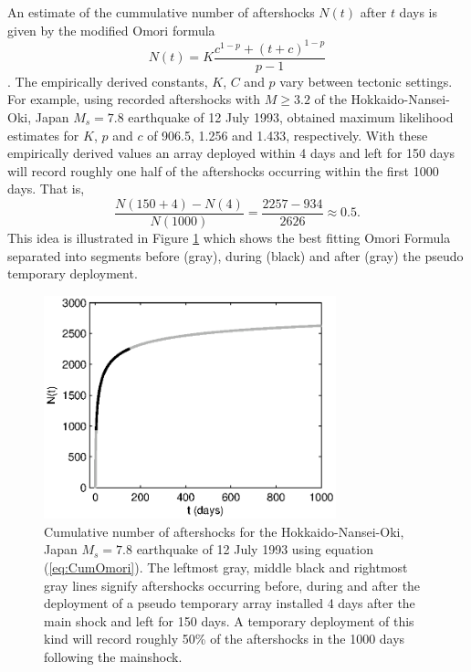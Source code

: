 \documentclass[extra, onecolumn, doublespacing]{gji}
\begin{document}
An estimate of the cummulative number of aftershocks $N(t)$ after
$t$ days is given by the modified Omori formula
\begin{equation}
\label{eq:CumOmori}
 N(t) = K \frac{c^{1-p} + (t+c)^{1-p}}{p-1}
\end{equation}
\citep{dr_Utsu95a}.
The empirically derived constants, $K$, $C$ and $p$ vary between
tectonic settings. For example, using recorded aftershocks with
$M\ge3.2$ of the  Hokkaido-Nansei-Oki, Japan $M_s=7.8$ earthquake of
12 July 1993, \citet{dr_Utsu95a} obtained maximum likelihood
estimates for $K$, $p$ and $c$ of 906.5, 1.256 and 1.433,
respectively.  With these empirically derived values an array
deployed within 4 days and left for 150 days will record roughly one
half of the aftershocks occurring within the first 1000 days. That
is,
\begin{equation}
\frac{N(150+4)-N(4)}{N(1000)} = \frac{2257-934}{2626} \approx 0.5.
\end{equation}
This idea is illustrated in Figure \ref{fig:Omorifigure} which shows
the best fitting Omori Formula separated into segments before
(gray), during (black) and after (gray) the pseudo temporary
deployment.

\begin{figure}
\noindent\includegraphics[width = 20pc]{diags/OmoriFigure.eps}
\caption{Cumulative number of aftershocks for the
Hokkaido-Nansei-Oki, Japan $M_s=7.8$ earthquake of 12 July 1993
using equation (\ref{eq:CumOmori}). The leftmost gray, middle black
and rightmost gray lines signify aftershocks occurring before,
during and after the deployment of a pseudo temporary array
installed 4 days after the main shock and left for 150 days. A
temporary deployment of this kind will record roughly 50\% of the
aftershocks in the 1000 days following the mainshock. }
\label{fig:Omorifigure}
\end{figure}
\end{document}
